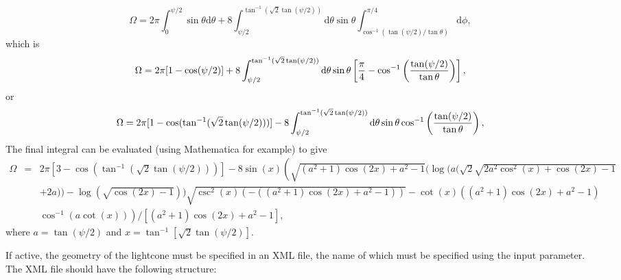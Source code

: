 \begin{description}
\begin{equation}
 \Omega = 2 \pi \int_0^{\psi/2} \sin\theta {\mathrm d}\theta + 8 \int_{\psi/2}^{\tan^{-1}(\sqrt{2}\tan(\psi/2))} {\mathrm d}\theta \sin\theta \int_{\cos^{-1}(\tan(\psi/2)/\tan\theta)}^{\pi/4} {\mathrm d}\phi,
\end{equation}
which is
\begin{equation}
 \Omega = 2 \pi [1-\cos(\psi/2)] + 8 \int_{\psi/2}^{\tan^{-1}(\sqrt{2}\tan(\psi/2))} {\mathrm d}\theta \sin\theta \left[ {\pi\over 4} - \cos^{-1}\left({\tan(\psi/2)\over \tan\theta}\right)\right],
\end{equation}
or
\begin{equation}
 \Omega = 2 \pi [1 - \cos(\tan^{-1}(\sqrt{2}\tan(\psi/2)))] - 8 \int_{\psi/2}^{\tan^{-1}(\sqrt{2}\tan(\psi/2))} {\mathrm d}\theta \sin\theta \cos^{-1}\left({\tan(\psi/2)\over \tan\theta}\right),
\end{equation}
The final integral can be evaluated (using Mathematica for example) to give
\begin{eqnarray}
 \Omega &=& 2 \pi [3 - \cos(\tan^{-1}(\sqrt{2}\tan(\psi/2)))] - 8 \sin(x) \left( \sqrt{(a^2+1)\cos(2x)+a^2-1}(\log(a(\sqrt{2}\sqrt{2a^2\cos^2(x)+\cos(2x)-1} \right. \nonumber \\ 
& &  +2a))-\log(\sqrt{\cos(2x)-1}))\sqrt{\csc^2(x)(-((a^2+1)\cos(2x)+a^2-1))}-\cot(x)((a^2+1)\cos(2x)+a^2-1) \nonumber \\
& & \left. \cos^{-1}(a \cot(x)) \right) / [(a^2+1)\cos(2x)+a^2-1],
\end{eqnarray}
where $a=\tan(\psi/2)$ and $x=\tan^{-1}[\sqrt{2}\tan (\psi/2)]$.
\end{description}
If active, the geometry of the lightcone must be specified in an XML file, the name of which must be specified using the {\normalfont \ttfamily [filterLightconeGeometryFileName]} input parameter. The XML file should have the following structure:
